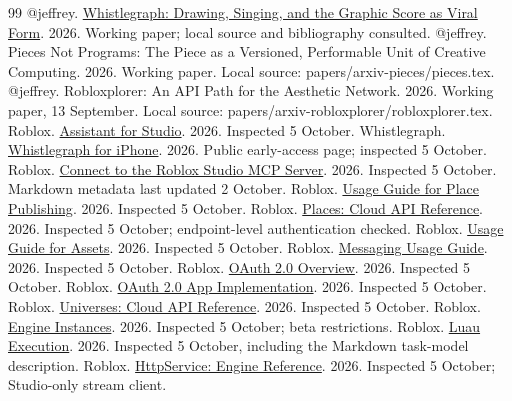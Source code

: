 \begin{thebibliography}{99}
\small
\setlength{\itemsep}{.3em}
 @jeffrey. \href{https://papers.aesthetic.computer/whistlegraph-26-arxiv.pdf}{Whistlegraph: Drawing, Singing, and the Graphic Score as Viral Form}. 2026. Working paper; local source and bibliography consulted.
 @jeffrey. Pieces Not Programs: The Piece as a Versioned, Performable Unit of Creative Computing. 2026. Working paper. Local source: papers/arxiv-pieces/pieces.tex.
 @jeffrey. Robloxplorer: An API Path for the Aesthetic Network. 2026. Working paper, 13 September. Local source: papers/arxiv-robloxplorer/robloxplorer.tex.
 Roblox. \href{https://create.roblox.com/docs/assistant/guide}{Assistant for Studio}. 2026. Inspected 5 October.
 Whistlegraph. \href{https://whistlegraph.app/}{Whistlegraph for iPhone}. 2026. Public early-access page; inspected 5 October.
 Roblox. \href{https://create.roblox.com/docs/studio/mcp}{Connect to the Roblox Studio MCP Server}. 2026. Inspected 5 October. Markdown metadata last updated 2 October.
 Roblox. \href{https://create.roblox.com/docs/cloud/guides/usage-place-publishing}{Usage Guide for Place Publishing}. 2026. Inspected 5 October.
 Roblox. \href{https://create.roblox.com/docs/cloud/reference/features/places}{Places: Cloud API Reference}. 2026. Inspected 5 October; endpoint-level authentication checked.
 Roblox. \href{https://create.roblox.com/docs/cloud/guides/usage-assets}{Usage Guide for Assets}. 2026. Inspected 5 October.
 Roblox. \href{https://create.roblox.com/docs/cloud/guides/usage-messaging}{Messaging Usage Guide}. 2026. Inspected 5 October.
 Roblox. \href{https://create.roblox.com/docs/cloud/auth/oauth2-overview}{OAuth 2.0 Overview}. 2026. Inspected 5 October.
 Roblox. \href{https://create.roblox.com/docs/cloud/auth/oauth2-develop}{OAuth 2.0 App Implementation}. 2026. Inspected 5 October.
 Roblox. \href{https://create.roblox.com/docs/cloud/reference/features/universes}{Universes: Cloud API Reference}. 2026. Inspected 5 October.
 Roblox. \href{https://create.roblox.com/docs/cloud/guides/instance}{Engine Instances}. 2026. Inspected 5 October; beta restrictions.
 Roblox. \href{https://create.roblox.com/docs/cloud/reference/features/luau-execution}{Luau Execution}. 2026. Inspected 5 October, including the Markdown task-model description.
 Roblox. \href{https://create.roblox.com/docs/reference/engine/classes/HttpService}{HttpService: Engine Reference}. 2026. Inspected 5 October; Studio-only stream client.

\end{thebibliography}

